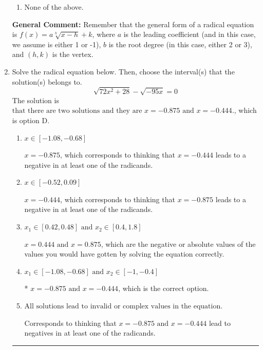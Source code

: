 \documentclass{extbook}[14pt]
\newcommand{\litem}[1]{\item #1

\rule{\textwidth}{0.4pt}}
\begin{document}
\begin{enumerate}
{\begin{enumerate}[label=\Alph*.]
\item None of the above.\end{enumerate}
\textbf{General Comment:} Remember that the general form of a radical equation is $ f(x) = a \sqrt[b]{x - h} + k $, where $a$ is the leading coefficient (and in this case, we assume is either 1 or -1), $b$ is the root degree (in this case, either 2 or 3), and $(h, k)$ is the vertex.
}
\litem{
Solve the radical equation below. Then, choose the interval(s) that the solution(s) belongs to.
\[ \sqrt{72 x^2 + 28} - \sqrt{-95 x} = 0 \]The solution is \( \text{that there are two solutions and they are } x = -0.875 \text{ and } x = -0.444. \), which is option D.\begin{enumerate}[label=\Alph*.]
\item \( x \in [-1.08,-0.68] \)

$x = -0.875$, which corresponds to thinking that $x = -0.444$ leads to a negative in at least one of the radicands.
\item \( x \in [-0.52,0.09] \)

$x = -0.444$, which corresponds to thinking that $x = -0.875$ leads to a negative in at least one of the radicands.
\item \( x_1 \in [0.42, 0.48] \text{ and } x_2 \in [0.4,1.8] \)

$x = 0.444 \text{ and } x = 0.875$, which are the negative or absolute values of the values you would have gotten by solving the equation correctly.
\item \( x_1 \in [-1.08, -0.68] \text{ and } x_2 \in [-1,-0.4] \)

* $x = -0.875 \text{ and } x = -0.444$, which is the correct option.
\item \( \text{All solutions lead to invalid or complex values in the equation.} \)

Corresponds to thinking that $x = -0.875 \text{ and } x = -0.444$ lead to negatives in at least one of the radicands.
\end{enumerate}

}
\end{enumerate}
\end{document}
